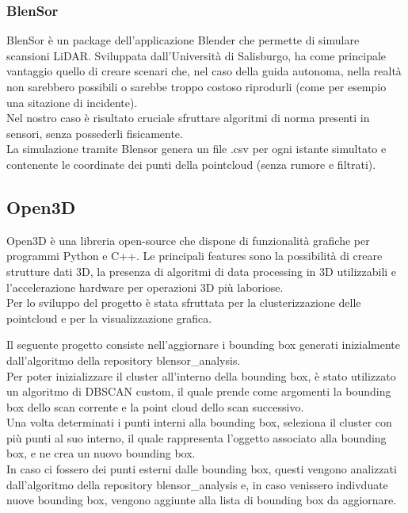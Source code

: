 \documentclass[italian]{article}
\begin{document}
\subsubsection{BlenSor}
BlenSor è un package dell'applicazione Blender che permette di simulare scansioni LiDAR. Sviluppata dall'Università di Salisburgo, ha come principale vantaggio quello di creare scenari che, nel caso della guida autonoma, nella realtà non sarebbero possibili o sarebbe troppo costoso riprodurli (come per esempio una sitazione di incidente).\\
Nel nostro caso è risultato cruciale sfruttare algoritmi di norma presenti in sensori, senza possederli fisicamente.\\
La simulazione tramite Blensor genera un file .csv per ogni istante simultato e contenente le coordinate dei punti della pointcloud (senza rumore e filtrati).%
\subsection{Open3D}
Open3D è una libreria open-source che dispone di funzionalità grafiche per programmi Python e C++. Le principali features sono la possibilità di creare strutture dati 3D, la presenza di algoritmi di data processing in 3D utilizzabili e l'accelerazione hardware per operazioni 3D più laboriose.\\
Per lo sviluppo del progetto è stata sfruttata per la clusterizzazione delle pointcloud e per la visualizzazione grafica.


Il seguente progetto consiste nell'aggiornare i bounding box generati inizialmente dall'algoritmo della repository blensor\_analysis.\\
Per poter inizializzare il cluster all'interno della bounding box, è stato utilizzato un algoritmo di DBSCAN custom, il quale prende come argomenti la bounding box dello scan corrente e la point cloud dello scan successivo.\\
Una volta determinati i punti interni alla bounding box, seleziona il cluster con più punti al suo interno, il quale rappresenta l'oggetto associato alla bounding box, e ne crea un nuovo bounding box.\\
In caso ci fossero dei punti esterni dalle bounding box, questi vengono analizzati dall'algoritmo della repository blensor\_analysis e, in caso venissero indivduate nuove bounding box, vengono aggiunte alla lista di bounding box da aggiornare.\\
\end{document}
